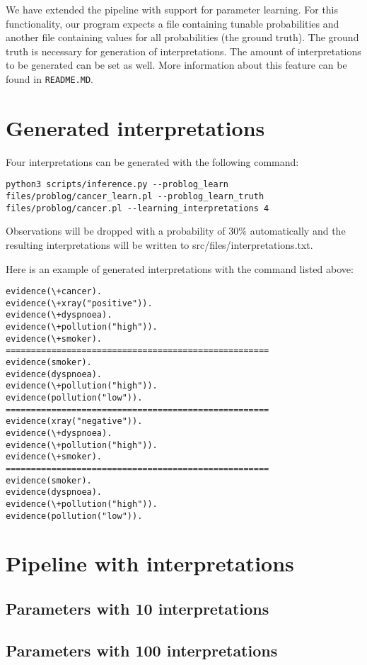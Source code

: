 We have extended the pipeline with support for parameter learning. For this functionality, our program expects a file containing tunable probabilities and another file containing values for all probabilities (the ground truth). The ground truth is necessary for generation of interpretations. The amount of interpretations to be generated can be set as well. More information about this feature can be found in \texttt{README.MD}.

\section{Generated interpretations}
Four interpretations can be generated with the following command:
\begin{lstlisting}
python3 scripts/inference.py --problog_learn files/problog/cancer_learn.pl --problog_learn_truth files/problog/cancer.pl --learning_interpretations 4
\end{lstlisting}
Observations will be dropped with a probability of 30\% automatically and the resulting interpretations will be written to src/files/interpretations.txt.

Here is an example of generated interpretations with the command listed above:
\begin{lstlisting}
evidence(\+cancer).
evidence(\+xray("positive")).
evidence(\+dyspnoea).
evidence(\+pollution("high")).
evidence(\+smoker).
====================================================
evidence(smoker).
evidence(dyspnoea).
evidence(\+pollution("high")).
evidence(pollution("low")).
====================================================
evidence(xray("negative")).
evidence(\+dyspnoea).
evidence(\+pollution("high")).
evidence(\+smoker).
====================================================
evidence(smoker).
evidence(dyspnoea).
evidence(\+pollution("high")).
evidence(pollution("low")).
\end{lstlisting}

\section{Pipeline with interpretations}
\subsection{Parameters with 10 interpretations}

\subsection{Parameters with 100 interpretations}

